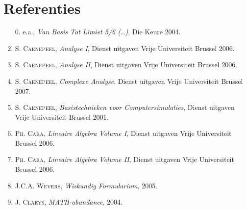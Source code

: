\section*{Referenties}
\label{sec:Referenties}
\begin{enumerate}
  \item[0.] e.a., \textit{Van Basis Tot Limiet 5/6 (\ldots)}, Die Keure 2004.
  \item \textsc{S. Caenepeel}, \textit{Analyse I}, Dienst uitgaven Vrije Universiteit Brussel 2006.
  \item \textsc{S. Caenepeel}, \textit{Analyse II}, Dienst uitgaven Vrije Universiteit Brussel 2006.
  \item \textsc{S. Caenepeel}, \textit{Complexe Analyse}, Dienst uitgaven Vrije Universiteit Brussel 2007.
  \item \textsc{S. Caenepeel}, \textit{Basistechnieken voor Computersimulaties}, Dienst uitgaven Vrije Universiteit Brussel 2001.
  \item \textsc{Ph. Cara}, \textit{Lineaire Algebra Volume I}, Dienst uitgaven Vrije Universiteit Brussel 2006.
  \item \textsc{Ph. Cara}, \textit{Lineaire Algebra Volume II}, Dienst uitgaven Vrije Universiteit Brussel 2006.
  \item \textsc{J.C.A. Wevers}, \textit{Wiskundig Formularium},
   2005.
  \item \textsc{J. Claeys}, \textit{MATH-abundance},
   2004.
\end{enumerate}
